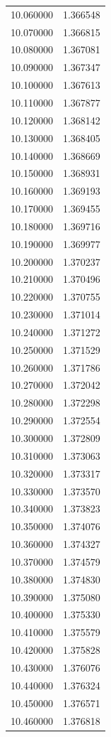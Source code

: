 \begin{tabular}{rr}
10.060000 & 1.366548 \\
10.070000 & 1.366815 \\
10.080000 & 1.367081 \\
10.090000 & 1.367347 \\
10.100000 & 1.367613 \\
10.110000 & 1.367877 \\
10.120000 & 1.368142 \\
10.130000 & 1.368405 \\
10.140000 & 1.368669 \\
10.150000 & 1.368931 \\
10.160000 & 1.369193 \\
10.170000 & 1.369455 \\
10.180000 & 1.369716 \\
10.190000 & 1.369977 \\
10.200000 & 1.370237 \\
10.210000 & 1.370496 \\
10.220000 & 1.370755 \\
10.230000 & 1.371014 \\
10.240000 & 1.371272 \\
10.250000 & 1.371529 \\
10.260000 & 1.371786 \\
10.270000 & 1.372042 \\
10.280000 & 1.372298 \\
10.290000 & 1.372554 \\
10.300000 & 1.372809 \\
10.310000 & 1.373063 \\
10.320000 & 1.373317 \\
10.330000 & 1.373570 \\
10.340000 & 1.373823 \\
10.350000 & 1.374076 \\
10.360000 & 1.374327 \\
10.370000 & 1.374579 \\
10.380000 & 1.374830 \\
10.390000 & 1.375080 \\
10.400000 & 1.375330 \\
10.410000 & 1.375579 \\
10.420000 & 1.375828 \\
10.430000 & 1.376076 \\
10.440000 & 1.376324 \\
10.450000 & 1.376571 \\
10.460000 & 1.376818 \\

\end{tabular}
